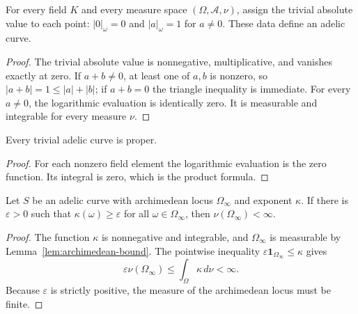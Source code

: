 \begin{definition}
\label{def:trivial-adelic-curve}
\leanok
{}
For every field $K$ and every measure space $(\Omega,\mathcal A,\nu)$,
assign the trivial absolute value to each point:
$|0|_\omega=0$ and $|a|_\omega=1$ for $a\ne0$.
These data define an adelic curve.
\end{definition}
\begin{proof}
The trivial absolute value is nonnegative, multiplicative, and vanishes
exactly at zero. If $a+b\ne0$, at least one of $a,b$ is nonzero, so
$|a+b|=1\leq|a|+|b|$; if $a+b=0$ the triangle inequality is immediate.
For every $a\ne0$, the logarithmic evaluation is identically zero.
It is measurable and integrable for every measure $\nu$.
\end{proof}

\begin{proposition}
\label{prop:proper-trivial-adelic-curve}
\leanok
{}
Every trivial adelic curve is proper.
\end{proposition}
\begin{proof}
For each nonzero field element the logarithmic evaluation is the zero
function. Its integral is zero, which is the product formula.
\end{proof}

\begin{lemma}
\label{lem:archimedean-locus-finite-measure}
\leanok
{}
Let $S$ be an adelic curve with archimedean locus $\Omega_\infty$
and exponent $\kappa$. If there is $\varepsilon>0$ such that
$\kappa(\omega)\geq\varepsilon$ for all $\omega\in\Omega_\infty$,
then $\nu(\Omega_\infty)<\infty$.
\end{lemma}
\begin{proof}
The function $\kappa$ is nonnegative and integrable, and
$\Omega_\infty$ is measurable by Lemma~\ref{lem:archimedean-bound}.
The pointwise inequality
$\varepsilon\mathbf1_{\Omega_\infty}\leq\kappa$ gives
\[
 \varepsilon\nu(\Omega_\infty)
 \leq\int_\Omega\kappa\,d\nu<\infty.
\]
Because $\varepsilon$ is strictly positive, the measure of the
archimedean locus must be finite.
\end{proof}

